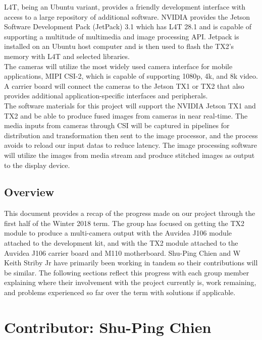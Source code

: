 \documentclass[letterpaper,10pt,serif,draftclsnofoot,onecolumn,compsoc,titlepage]{IEEEtran}
\begin{document}
L4T, being an Ubuntu variant, provides a friendly development interface with access to a 
large repository of additional software.
NVIDIA provides the Jetson Software Development Pack (JetPack) 3.1 which has L4T 28.1 
and is capable of supporting a multitude of multimedia and image processing API. Jetpack 
is installed on an Ubuntu host computer and is then used to flash the TX2's memory with L4T and 
selected libraries. \\

The cameras will utilize the most widely used camera interface for mobile applications, 
MIPI CSI-2, which is capable of supporting 1080p, 4k, and 8k video. 
A carrier board will connect the cameras to the Jetson TX1 or TX2 that also provides 
additional application-specific interfaces and peripherals. \\

The software materials for this project will support the NVIDIA Jetson TX1 and TX2 and 
be able to produce fused images from cameras in near real-time. The media inputs from 
cameras through CSI will be captured in pipelines for distribution and transformation 
then sent to the image processor, and the process avoids to reload our input datas to 
reduce latency. The image processing software will utilize the images from media stream 
and produce stitched images as output to the display device.  \\

\subsection{Overview}
This document provides a recap of the progress made on our project through the first half
of the Winter 2018 term. The group has focused on getting the TX2 module to produce a 
multi-camera output with the Auvidea J106 module attached to the development kit, and with 
the TX2 module attached to the Auvidea J106 carrier board and M110 motherboard. 
Shu-Ping Chien and W Keith Striby Jr have primarily been working in tandem so their 
contributions will be similar. The following 
sections reflect this progress with each group member explaining where their involvement 
with the project currently is, work remaining, and problems experienced so far over the term 
with solutions if applicable. \\ 


\section{Contributor: Shu-Ping Chien}
\end{document}
